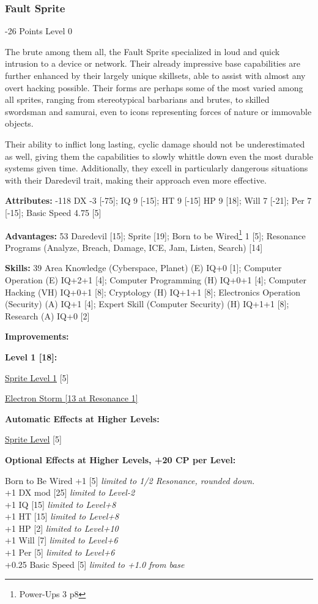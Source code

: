 \begin{multicols*}{3}
\subsubsection{Fault Sprite}
\begin{flushright}
	-26 Points Level 0
\end{flushright}

The brute among them all, the Fault Sprite specialized in loud and quick intrusion to a device or network. Their already impressive base capabilities are further enhanced by their largely unique skillsets, able to assist with almost any overt hacking possible. Their forms are perhaps some of the most varied among all sprites, ranging from stereotypical barbarians and brutes, to skilled swordsman and samurai, even to icons representing forces of nature or immovable objects.

Their ability to inflict long lasting, cyclic damage should not be underestimated as well, giving them the capabilities to slowly whittle down even the most durable systems given time. Additionally, they excell in particularly dangerous situations with their Daredevil trait, making their approach even more effective.

\textbf{Attributes:} -118
DX -3 [-75]; IQ 9 [-15]; HT 9 [-15]
HP 9 [18]; Will 7 [-21]; Per 7 [-15]; Basic Speed 4.75 [5]

\textbf{Advantages:} 53
Daredevil [15]; Sprite [19]; Born to be Wired\footnote{Power-Ups 3 p8} 1 [5]; Resonance Programs (Analyze, Breach, Damage, ICE, Jam, Listen, Search) [14]

\textbf{Skills:} 39
Area Knowledge (Cyberspace, Planet) (E) IQ+0 [1]; Computer Operation (E) IQ+2+1 [4]; Computer Programming (H) IQ+0+1 [4]; Computer Hacking (VH) IQ+0+1 [8]; Cryptology (H) IQ+1+1 [8]; Electronics Operation (Security) (A) IQ+1 [4]; Expert Skill (Computer Security) (H) IQ+1+1 [8]; Research (A) IQ+0 [2]

\textbf{ Improvements:}

\textbf{Level 1 [18]:}

\hyperref[sprite_level]{Sprite Level 1} [5]

\hyperref[electron_storm]{Electron Storm [13 at Resonance 1]}

\textbf{Automatic Effects at Higher Levels:}

\hyperref[sprite_level]{Sprite Level} [5]

\textbf{Optional Effects at Higher Levels, +20 CP per Level:}

Born to Be Wired +1 [5] \textit{limited to 1/2 Resonance, rounded down.}\\
+1 DX mod [25] \textit{limited to Level-2}\\
+1 IQ [15] \textit{limited to Level+8}\\
+1 HT [15] \textit{limited to Level+8}\\
+1 HP [2] \textit{limited to Level+10}\\
+1 Will [7] \textit{limited to Level+6}\\
+1 Per [5] \textit{limited to Level+6}\\
+0.25 Basic Speed [5] \textit{limited to +1.0 from base}\\



\end{multicols*}
